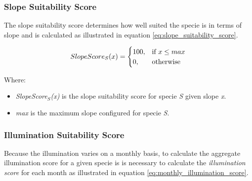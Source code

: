 \subsubsection{Slope Suitability Score}

The slope suitability score determines how well suited the specie is in terms of slope and is calculated as illustrated in equation \ref{eq:slope_suitability_score}.

\begin{equation}
\centering
SlopeScore_{S}(x) = 
\begin{cases}
    100, & \text{if } x \leq max \\
    0,              & \text{otherwise}
\end{cases}
\label{eq:slope_suitability_score}
\end{equation}

Where:
\begin{itemize}
\item \textit{SlopeScore$_{S}$(x)} is the slope suitability score for specie \textit{S} given slope \textit{x}.
\item \textit{max} is the maximum slope configured for specie \textit{S}.
\end{itemize}

\subsubsection{Illumination Suitability Score}

Because the illumination varies on a monthly basis, to calculate the aggregate illumination score for a given specie is is necessary to calculate the \textit{illumination score} for each month as illustrated in equation \ref{eq:monthly_illumination_score}.

